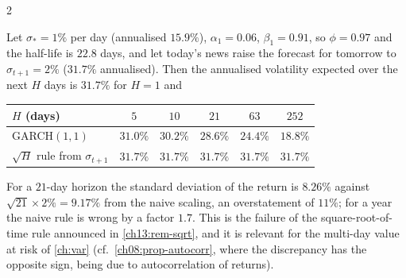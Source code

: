 \begin{paracol}{2}
\begin{example}\label{ch13:ex-forecast}
Let $\sigma_*=1\%$ per day (annualised $15.9\%$), $\alpha_1=0.06$, $\beta_1=0.91$, so $\phi=0.97$ and the half-life is $22.8$ days, and let today's news raise the forecast for tomorrow to $\sigma_{t+1}=2\%$
($31.7\%$ annualised). Then the annualised volatility expected over the next $H$ days is $31.7\%$ for $H=1$ and
\begin{center}\small
\begin{tabular}{@{}lccccc@{}}
\toprule
$H$ (days) & $5$ & $10$ & $21$ & $63$ & $252$\\
\midrule
GARCH$(1,1)$ & $31.0\%$ & $30.2\%$ & $28.6\%$ & $24.4\%$ & $18.8\%$\\
$\sqrt H$ rule from $\sigma_{t+1}$ & $31.7\%$ & $31.7\%$ & $31.7\%$ & $31.7\%$ & $31.7\%$\\
\bottomrule
\end{tabular}
\end{center}
For a $21$-day horizon the standard deviation of the return is $8.26\%$ against $\sqrt{21}\times2\%=9.17\%$ from the naive scaling, an overstatement of $11\%$; for a year the naive rule is wrong by a
factor $1.7$. This is the failure of the square-root-of-time rule announced in \cref{ch13:rem-sqrt}, and it is relevant for the multi-day value at risk of \cref{ch:var} (cf.\ \cref{ch08:prop-autocorr}, where the discrepancy has the opposite sign, being due to autocorrelation of returns).
\end{example}


\end{paracol}
